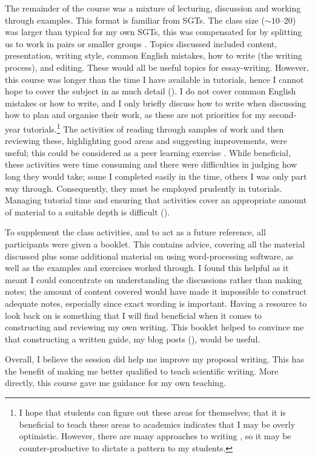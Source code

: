 The remainder of the course was a mixture of lecturing, discussion and working through examples. This format is familiar from SGTs. The class size ($\sim10$--$20$) was larger than typical for my own SGTs, this was compensated for by splitting us to work in pairs or smaller groups \citep{Ayres2015}. Topics discussed included content, presentation, writing style, common English mistakes, how to write (the writing process), and editing. These would all be useful topics for essay-writing. However, this course was longer than the time I have available in tutorials, hence I cannot hope to cover the subject in as much detail (). I do not cover common English mistakes or how to write, and I only briefly discuss how to write when discussing how to plan and organise their work, as these are not priorities for my second-year tutorials.\footnote{I hope that students can figure out these areas for themselves; that it is beneficial to teach these areas to academics indicates that I may be overly optimistic. However, there are many approaches to writing \citep{Biggs1988}, so it may be counter-productive to dictate a pattern to my students.} The activities of reading through samples of work and then reviewing these, highlighting good areas and suggesting improvements, were useful; this could be considered as a peer learning exercise \citep[chapter 1]{Falchikov2001}. While beneficial, these activities were time consuming and there were difficulties in judging how long they would take; some I completed easily in the time, others I was only part way through. Consequently, they must be employed prudently in tutorials. Managing tutorial time and ensuring that activities cover an appropriate amount of material to a suitable depth is difficult ().

To supplement the class activities, and to act as a future reference, all participants were given a booklet. This contains advice, covering all the material discussed plus some additional material on using word-processing software, as well as the examples and exercises worked through. I found this helpful as it meant I could concentrate on understanding the discussions rather than making notes; the amount of content covered would have made it impossible to construct adequate notes, especially since exact wording is important. Having a resource to look back on is something that I will find beneficial when it comes to constructing and reviewing my own writing. This booklet helped to convince me that constructing a written guide, my blog posts (), would be useful.

Overall, I believe the session did help me improve my proposal writing. This has the benefit of making me better qualified to teach scientific writing. More directly, this course gave me guidance for my own teaching.
